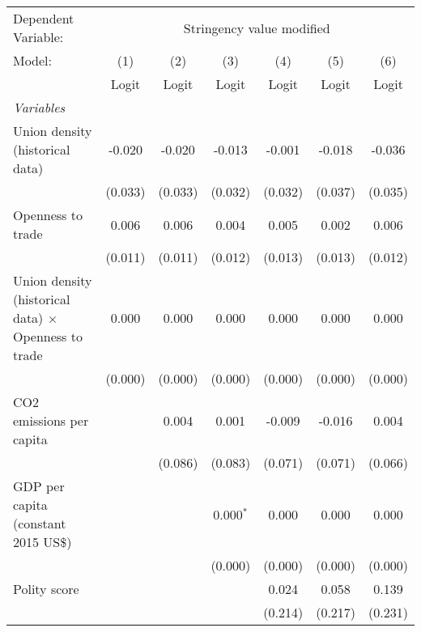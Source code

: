 
\begingroup
\centering
\begin{tabular}{lcccccc}
   \toprule
   Dependent Variable: & \multicolumn{6}{c}{Stringency value modified}\\
   Model:                                                      & (1)     & (2)     & (3)         & (4)     & (5)     & (6)\\  
                                                               &  Logit  & Logit   & Logit       & Logit   & Logit   & Logit\\  
   \midrule
   \emph{Variables}\\
   Union density (historical data)                             & -0.020  & -0.020  & -0.013      & -0.001  & -0.018  & -0.036\\   
                                                               & (0.033) & (0.033) & (0.032)     & (0.032) & (0.037) & (0.035)\\   
   Openness to trade                                           & 0.006   & 0.006   & 0.004       & 0.005   & 0.002   & 0.006\\   
                                                               & (0.011) & (0.011) & (0.012)     & (0.013) & (0.013) & (0.012)\\   
   Union density (historical data) $\times$ Openness to trade  & 0.000   & 0.000   & 0.000       & 0.000   & 0.000   & 0.000\\   
                                                               & (0.000) & (0.000) & (0.000)     & (0.000) & (0.000) & (0.000)\\   
   CO2 emissions per capita                                    &         & 0.004   & 0.001       & -0.009  & -0.016  & 0.004\\   
                                                               &         & (0.086) & (0.083)     & (0.071) & (0.071) & (0.066)\\   
   GDP per capita (constant 2015 US\$)                         &         &         & 0.000$^{*}$ & 0.000   & 0.000   & 0.000\\   
                                                               &         &         & (0.000)     & (0.000) & (0.000) & (0.000)\\   
   Polity score                                                &         &         &             & 0.024   & 0.058   & 0.139\\   
                                                               &         &         &             & (0.214) & (0.217) & (0.231)\\   

\end{tabular}
